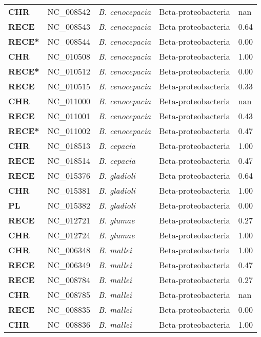 \begin{adjustwidth}{-3cm}{2cm}
{\begin{supertabular}{>{\bfseries}l|p{0.1\textwidth}p{0.14\textwidth}l|l}
CHR & NC\_008542 & \textit{B. cenocepacia} & Beta-proteobacteria & nan\\
RECE & NC\_008543 & \textit{B. cenocepacia} & Beta-proteobacteria & 0.64\\
RECE* & NC\_008544 & \textit{B. cenocepacia} & Beta-proteobacteria & 0.00\\
CHR & NC\_010508 & \textit{B. cenocepacia} & Beta-proteobacteria & 1.00\\
RECE* & NC\_010512 & \textit{B. cenocepacia} & Beta-proteobacteria & 0.00\\
RECE & NC\_010515 & \textit{B. cenocepacia} & Beta-proteobacteria & 0.33\\
CHR & NC\_011000 & \textit{B. cenocepacia} & Beta-proteobacteria & nan\\
RECE & NC\_011001 & \textit{B. cenocepacia} & Beta-proteobacteria & 0.43\\
RECE* & NC\_011002 & \textit{B. cenocepacia} & Beta-proteobacteria & 0.47\\
CHR & NC\_018513 & \textit{B. cepacia} & Beta-proteobacteria & 1.00\\
RECE & NC\_018514 & \textit{B. cepacia} & Beta-proteobacteria & 0.47\\
RECE & NC\_015376 & \textit{B. gladioli} & Beta-proteobacteria & 0.64\\
CHR & NC\_015381 & \textit{B. gladioli} & Beta-proteobacteria & 1.00\\
PL & NC\_015382 & \textit{B. gladioli} & Beta-proteobacteria & 0.00\\
RECE & NC\_012721 & \textit{B. glumae} & Beta-proteobacteria & 0.27\\
CHR & NC\_012724 & \textit{B. glumae} & Beta-proteobacteria & 1.00\\
CHR & NC\_006348 & \textit{B. mallei} & Beta-proteobacteria & 1.00\\
RECE & NC\_006349 & \textit{B. mallei} & Beta-proteobacteria & 0.47\\
RECE & NC\_008784 & \textit{B. mallei} & Beta-proteobacteria & 0.27\\
CHR & NC\_008785 & \textit{B. mallei} & Beta-proteobacteria & nan\\
RECE & NC\_008835 & \textit{B. mallei} & Beta-proteobacteria & 0.00\\
CHR & NC\_008836 & \textit{B. mallei} & Beta-proteobacteria & 1.00\\

\end{supertabular}}
\end{adjustwidth}
